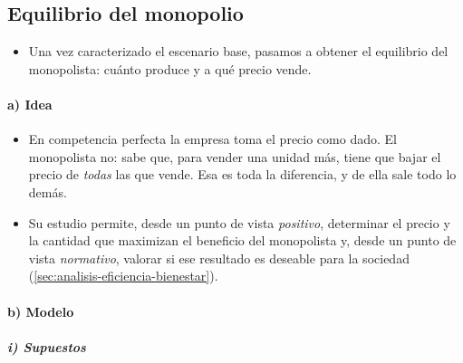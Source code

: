 \documentclass[11pt]{article}
\begin{document}
\subsection{Equilibrio del monopolio}\label{sec:equilibrio-monopolio}

\begin{itemize}
\item Una vez caracterizado el escenario base, pasamos a obtener el equilibrio del monopolista: cuánto produce y a qué precio vende.
\end{itemize}

\paragraph{a) Idea}

\begin{itemize}
\item En competencia perfecta la empresa toma el precio como dado. El monopolista no: sabe que, para vender una unidad más, tiene que bajar el precio de \emph{todas} las que vende. Esa es toda la diferencia, y de ella sale todo lo demás.
\item Su estudio permite, desde un punto de vista \emph{positivo}, determinar el precio y la cantidad que maximizan el beneficio del monopolista y, desde un punto de vista \emph{normativo}, valorar si ese resultado es deseable para la sociedad (\ref{sec:analisis-eficiencia-bienestar}).
\end{itemize}

\paragraph{b) Modelo}

\subparagraph{i) Supuestos}
\end{document}
